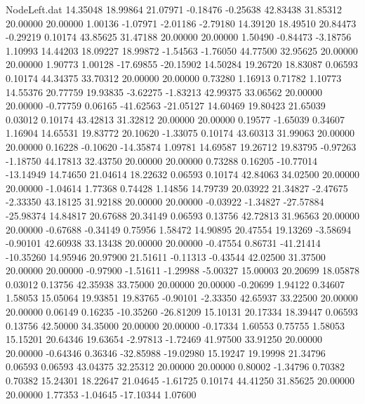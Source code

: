 \begin{filecontents}{NodeLeft.dat}
  14.35048   18.99864   21.07971    -0.18476   -0.25638   42.83438   31.85312   20.00000   20.00000    1.00136   -1.07971   -2.01186   -2.79180
  14.39120   18.49510   20.84473    -0.29219    0.10174   43.85625   31.47188   20.00000   20.00000    1.50490   -0.84473   -3.18756    1.10993
  14.44203   18.09227   18.99872    -1.54563   -1.76050   44.77500   32.95625   20.00000   20.00000    1.90773    1.00128  -17.69855  -20.15902
  14.50284   19.26720   18.83087     0.06593    0.10174   44.34375   33.70312   20.00000   20.00000    0.73280    1.16913    0.71782    1.10773
  14.55376   20.77759   19.93835    -3.62275   -1.83213   42.99375   33.06562   20.00000   20.00000   -0.77759    0.06165  -41.62563  -21.05127
  14.60469   19.80423   21.65039     0.03012    0.10174   43.42813   31.32812   20.00000   20.00000    0.19577   -1.65039    0.34607    1.16904
  14.65531   19.83772   20.10620    -1.33075    0.10174   43.60313   31.99063   20.00000   20.00000    0.16228   -0.10620  -14.35874    1.09781
  14.69587   19.26712   19.83795    -0.97263   -1.18750   44.17813   32.43750   20.00000   20.00000    0.73288    0.16205  -10.77014  -13.14949
  14.74650   21.04614   18.22632     0.06593    0.10174   42.84063   34.02500   20.00000   20.00000   -1.04614    1.77368    0.74428    1.14856
  14.79739   20.03922   21.34827    -2.47675   -2.33350   43.18125   31.92188   20.00000   20.00000   -0.03922   -1.34827  -27.57884  -25.98374
  14.84817   20.67688   20.34149     0.06593    0.13756   42.72813   31.96563   20.00000   20.00000   -0.67688   -0.34149    0.75956    1.58472
  14.90895   20.47554   19.13269    -3.58694   -0.90101   42.60938   33.13438   20.00000   20.00000   -0.47554    0.86731  -41.21414  -10.35260
  14.95946   20.97900   21.51611    -0.11313   -0.43544   42.02500   31.37500   20.00000   20.00000   -0.97900   -1.51611   -1.29988   -5.00327
  15.00003   20.20699   18.05878     0.03012    0.13756   42.35938   33.75000   20.00000   20.00000   -0.20699    1.94122    0.34607    1.58053
  15.05064   19.93851   19.83765    -0.90101   -2.33350   42.65937   33.22500   20.00000   20.00000    0.06149    0.16235  -10.35260  -26.81209
  15.10131   20.17334   18.39447     0.06593    0.13756   42.50000   34.35000   20.00000   20.00000   -0.17334    1.60553    0.75755    1.58053
  15.15201   20.64346   19.63654    -2.97813   -1.72469   41.97500   33.91250   20.00000   20.00000   -0.64346    0.36346  -32.85988  -19.02980
  15.19247   19.19998   21.34796     0.06593    0.06593   43.04375   32.25312   20.00000   20.00000    0.80002   -1.34796    0.70382    0.70382
  15.24301   18.22647   21.04645    -1.61725    0.10174   44.41250   31.85625   20.00000   20.00000    1.77353   -1.04645  -17.10344    1.07600

\end{filecontents}

